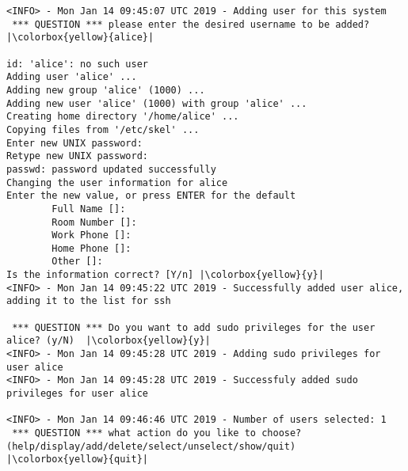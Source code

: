 \begin{lstlisting}[escapeinside=||]
<INFO> - Mon Jan 14 09:45:07 UTC 2019 - Adding user for this system
 *** QUESTION *** please enter the desired username to be added?  |\colorbox{yellow}{alice}|

id: 'alice': no such user
Adding user 'alice' ...
Adding new group 'alice' (1000) ...
Adding new user 'alice' (1000) with group 'alice' ...
Creating home directory '/home/alice' ...
Copying files from '/etc/skel' ...
Enter new UNIX password:
Retype new UNIX password:
passwd: password updated successfully
Changing the user information for alice
Enter the new value, or press ENTER for the default
        Full Name []:
        Room Number []:
        Work Phone []:
        Home Phone []:
        Other []:
Is the information correct? [Y/n] |\colorbox{yellow}{y}|
<INFO> - Mon Jan 14 09:45:22 UTC 2019 - Successfully added user alice, adding it to the list for ssh

 *** QUESTION *** Do you want to add sudo privileges for the user alice? (y/N)  |\colorbox{yellow}{y}|
<INFO> - Mon Jan 14 09:45:28 UTC 2019 - Adding sudo privileges for user alice
<INFO> - Mon Jan 14 09:45:28 UTC 2019 - Successfuly added sudo privileges for user alice

<INFO> - Mon Jan 14 09:46:46 UTC 2019 - Number of users selected: 1
 *** QUESTION *** what action do you like to choose? (help/display/add/delete/select/unselect/show/quit)  |\colorbox{yellow}{quit}|
\end{lstlisting}

